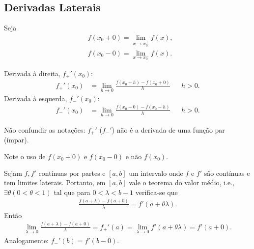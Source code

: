 \subsection{Derivadas Laterais}
Seja
\begin{align*}
    & f(x_0 + 0) = \lim_{x \to x_0^+} f(x), \\
    & f(x_0 - 0) = \lim_{x \to x_0^-} f(x).
\end{align*}

\begin{defi}
    Derivada \`{a} direita, $f_+'(x_0)$:
    \begin{align*}
        f_+'(x_0) &= \lim_{h \to 0} \frac{f(x_0 + h) - f(x_0 + 0)}{h} && h > 0.
    \end{align*}
    Derivada \`{a} esquerda, $f_-'(x_0)$:
    \begin{align*}
        f_-'(x_0) &= \lim_{h \to 0} \frac{f(x_0 - 0) - f(x_0 - h)}{h} && h > 0.
    \end{align*}
\end{defi}
\begin{obs}
    N\~{a}o confundir as nota\c{c}\~{o}es: $f_+'$ ($f_-'$) n\~{a}o \'{e} a derivada de uma fun\c{c}\~{a}o par (\'{i}mpar).
\end{obs}
\begin{obs}
    Note o uso de $f(x_0 + 0)$ e $f(x_0 - 0)$ e n\~{a}o $f(x_0)$.
\end{obs}

Sejam $f, f'$ cont\'{i}nuas por partes e $[a,b]$ um intervalo onde $f$ e $f'$ s\~{a}o cont\'{i}nuas e tem limites laterais. Portanto, em $[a,b]$ vale o teorema do valor m\'{e}dio, i.e., $\exists \theta (0 < \theta < 1)$ tal que para $0 < \lambda < b - 1$ verifica-se que
\begin{align*}
    \frac{f(a + \lambda) - f(a + 0)}{\lambda} = f'(a + \theta \lambda).
\end{align*}
Ent\~{a}o
\begin{align*}
    \lim_{\lambda \to 0} \frac{f(a + \lambda) - f(a + 0)}{\lambda} = f_+'(a) = \lim_{\lambda \to 0} f'(a + \theta \lambda) = f'(a + 0).
\end{align*}
Analogamente: $f_-'(b) = f'(b - 0)$.

